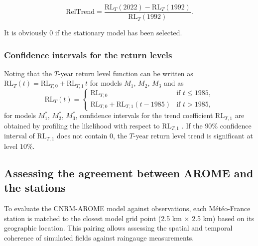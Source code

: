 \documentclass[hess, manuscript]{copernicus}
\begin{document}
\[
\mathrm{RelTrend} =
\frac{\mathrm{RL}_{T}(2022)-\mathrm{RL}_{T}(1992)}
{\mathrm{RL}_{T}(1992)}.
\]

It is obviously $0$ if the stationary model has been selected.

\subsubsection{Confidence intervals for the return levels}\label{maximu-likelihood-estimation-and-confidence-intervales}

Noting that the
$T$-year return level function can be written as
$\mathrm{RL}_{T}(t)=\mathrm{RL}_{T,0}+\mathrm{RL}_{T,1}\, t$
for models $M_{1}$, $M_{2}$, $M_{3}$ and as
\[
\mathrm{RL}_{T}(t)=
\begin{cases}
\mathrm{RL}_{T,0} & \text{if } t \leq 1985,\\[4pt]
\mathrm{RL}_{T,0}+\mathrm{RL}_{T,1}(t-1985) & \text{if } t>1985,
\end{cases}
\]
for models $M_{1}^{*}$, $M_{2}^{*}$, $M_{3}^{*}$,
confidence intervals for the trend coefficient $\mathrm{RL}_{T,1}$ are obtained
by profiling the likelihood with respect to $\mathrm{RL}_{T,1}$ \citep{coles2001introduction}. If
the $90\%$ confidence interval of $\mathrm{RL}_{T,1}$ does not contain $0$, the
$T$-year return level trend is significant at level $10\%$.



\subsection{Assessing the agreement between AROME and the stations}\label{assessing}

To evaluate the CNRM-AROME model against observations, each Météo-France station is matched to the closest model grid point (2.5 km $\times$ 2.5 km) based on its geographic location. This pairing allows assessing the spatial and temporal coherence of simulated fields against raingauge measurements.
\end{document}
